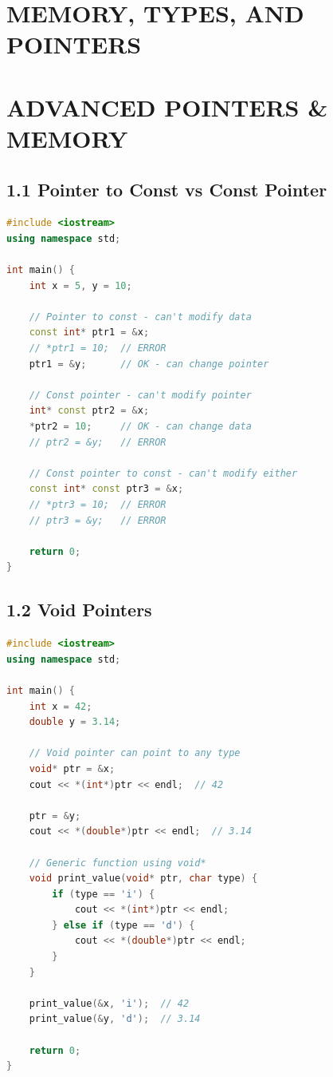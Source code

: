 \hypertarget{memory-types-and-pointers}{%
\chapter{MEMORY, TYPES, AND POINTERS}\label{memory-types-and-pointers}}

\hypertarget{advanced-pointers-memory}{%
\chapter{ADVANCED POINTERS \& MEMORY}\label{advanced-pointers-memory}}

\hypertarget{pointer-to-const-vs-const-pointer}{%
\section{1.1 Pointer to Const vs Const
Pointer}\label{pointer-to-const-vs-const-pointer}}

\begin{lstlisting}[language={C++}]
#include <iostream>
using namespace std;

int main() {
    int x = 5, y = 10;
    
    // Pointer to const - can't modify data
    const int* ptr1 = &x;
    // *ptr1 = 10;  // ERROR
    ptr1 = &y;      // OK - can change pointer
    
    // Const pointer - can't modify pointer
    int* const ptr2 = &x;
    *ptr2 = 10;     // OK - can change data
    // ptr2 = &y;   // ERROR
    
    // Const pointer to const - can't modify either
    const int* const ptr3 = &x;
    // *ptr3 = 10;  // ERROR
    // ptr3 = &y;   // ERROR
    
    return 0;
}
\end{lstlisting}

\hypertarget{void-pointers}{%
\section{1.2 Void Pointers}\label{void-pointers}}

\begin{lstlisting}[language={C++}]
#include <iostream>
using namespace std;

int main() {
    int x = 42;
    double y = 3.14;
    
    // Void pointer can point to any type
    void* ptr = &x;
    cout << *(int*)ptr << endl;  // 42
    
    ptr = &y;
    cout << *(double*)ptr << endl;  // 3.14
    
    // Generic function using void*
    void print_value(void* ptr, char type) {
        if (type == 'i') {
            cout << *(int*)ptr << endl;
        } else if (type == 'd') {
            cout << *(double*)ptr << endl;
        }
    }
    
    print_value(&x, 'i');  // 42
    print_value(&y, 'd');  // 3.14
    
    return 0;
}
\end{lstlisting}

